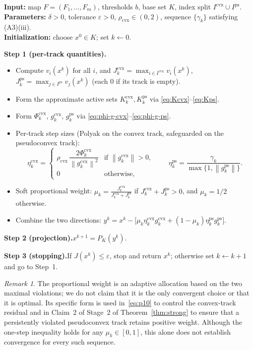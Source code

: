\documentclass[]{interact}
\theoremstyle{plain}
\theoremstyle{definition}
\theoremstyle{remark}
\newtheorem{remark}{Remark}
\newcommand{\algstep}[1]{\smallskip\noindent\textbf{#1}}
\newcommand{\norm}[1]{\left\lVert #1 \right\rVert}
\newcommand{\cvx}{\mathrm{cvx}}
\newcommand{\ps}{\mathrm{ps}}
\begin{document}
\begin{algorithm}[H]
\caption{Dual-Track Adaptive Projection (DTAP) for the normal-box NSFP
\eqref{eq:nsfp-box}.}
\label{alg:dtap}
\small
\noindent\textbf{Input:} map $F=(F_1,\dots,F_m)$, thresholds $b$, base set $K$, index
split $I^{\cvx}\cup I^{\ps}$.\\
\textbf{Parameters:} $\delta>0$, tolerance $\varepsilon>0$, $\rho_{\cvx}\in(0,2)$,
sequence $\{\gamma_k\}$ satisfying (A3)(iii).\\
\textbf{Initialization:} choose $x^0\in K$; set $k\leftarrow 0$.

\algstep{Step 1 (per-track quantities).}
\begin{itemize}[leftmargin=1.6em,itemsep=1pt,topsep=2pt]
\item[(1a)] Compute $v_i(x^k)$ for all $i$, and $J^{\cvx}_k=\max_{i\in I^{\cvx}}v_i(x^k)$,
$J^{\ps}_k=\max_{j\in I^{\ps}}v_j(x^k)$ (each $0$ if its track is empty).
\item[(1b)] Form the approximate active sets $K^{\cvx}_k,K^{\ps}_k$ via
\eqref{eq:Kcvx}--\eqref{eq:Kps}.
\item[(1c)] Form $\Phi^{\cvx}_k$, $g^{\cvx}_k$, $g^{\ps}_k$ via
\eqref{eq:phi-g-cvx}--\eqref{eq:phi-g-ps}.
\item[(1d)] Per-track step sizes (Polyak on the convex track, safeguarded on the
pseudoconvex track):
\[
\eta^{\cvx}_k=\begin{cases}\rho_{\cvx}\,\dfrac{2\Phi^{\cvx}_k}{\norm{g^{\cvx}_k}^2} & \text{if }\norm{g^{\cvx}_k}>0,\\ 0 & \text{otherwise,}\end{cases}
\qquad
\eta^{\ps}_k=\frac{\gamma_k}{\max\{1,\norm{g^{\ps}_k}\}} .
\]
\item[(1e)] Soft proportional weight:
$\displaystyle \mu_k=\frac{J^{\cvx}_k}{J^{\cvx}_k+J^{\ps}_k}$ if
$J^{\cvx}_k+J^{\ps}_k>0$, and $\mu_k=1/2$ otherwise.
\item[(1f)] Combine the two directions:
$\displaystyle y^k=x^k-\bigl[\mu_k\eta^{\cvx}_k g^{\cvx}_k+(1-\mu_k)\eta^{\ps}_k g^{\ps}_k\bigr].$
\end{itemize}
\algstep{Step 2 (projection).}\quad $x^{k+1}=P_K(y^k)$.

\algstep{Step 3 (stopping).}\quad If $J(x^k)\le\varepsilon$, stop and return $x^k$;
otherwise set $k\leftarrow k+1$ and go to Step~1.
\end{algorithm}

\begin{remark}\label{rem:weight-scope}
The proportional weight is an adaptive allocation based on the two maximal violations;
we do not claim that it is the only convergent choice or that it is optimal.
Its specific form is used in~\eqref{eq:p10} to control the convex-track residual and in
Claim~2 of Stage~2 of Theorem~\ref{thm:strong} to ensure that a persistently violated
pseudoconvex track retains positive weight. Although the one-step inequality holds for
any $\mu_k\in[0,1]$, this alone does not establish convergence for every such sequence.
\end{remark}
\end{document}
